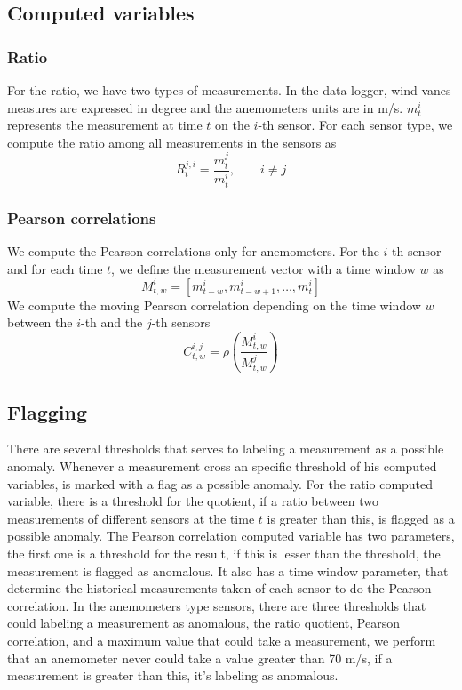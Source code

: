 \documentclass[journal]{IEEEtran}
\begin{document}
\subsection{Computed variables}\label{subsec:computedvariables}
\subsubsection{Ratio}
For the ratio, we have two types of measurements. In the data logger, wind vanes measures are expressed in degree and the anemometers units are in m/s.  $m_t^{i}$ represents the measurement at time $t$ on the $i$-th sensor.
For each sensor type, we compute the ratio among all measurements in the sensors as
\begin{equation} 
R_{t}^{j,i} = \frac{m_{t}^{j}}{m_{t}^{i}},\qquad i \neq j 
\end{equation}

\subsubsection{Pearson correlations}
We compute the Pearson correlations only for anemometers. For the $i$-th sensor and for each time $t$, we define the measurement vector with a time window $w$ as 
\begin{equation}
M^i_{t,w} = [m_{t-w}^i,m_{t-w+1}^i,\ldots,m_t^i]
\end{equation}
We compute the moving Pearson correlation depending on the time window $w$ between the $i$-th and the $j$-th sensors
\begin{equation}
C^{i,j}_{t,w}= \rho\left( \frac{M^i_{t,w}}{M^j_{t,w}}\right)
\end{equation}

\subsection{Flagging}\label{subsec:flagging}
There are several thresholds that serves to labeling a measurement as a possible anomaly. Whenever a measurement cross an specific threshold of his computed variables, is marked with a flag as a possible anomaly. 
For the ratio computed variable, there is a threshold for the quotient, if a ratio between two measurements of different sensors at the time $t$ is greater than this, is flagged as a possible anomaly. 
The Pearson correlation computed variable has two parameters, the first one is a threshold for the result, if this is lesser than the threshold, the measurement is flagged as anomalous. It also has a time window parameter, that determine the historical measurements taken of each sensor to do the Pearson correlation.
In the anemometers type sensors, there are three thresholds that could labeling a measurement as anomalous, the ratio quotient, Pearson correlation, and a maximum value that could take a measurement, we perform that an anemometer never could take a value greater than 70 m/s, if a measurement is greater than this, it's labeling as anomalous.
\end{document}
